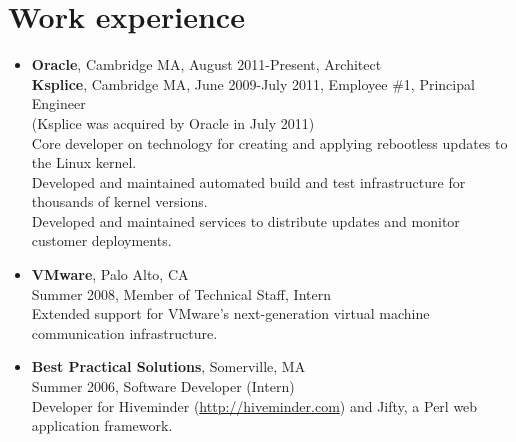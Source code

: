 \documentclass[letterpaper,10pt]{article}
\begin{document}
\section*{Work experience}
\vspace*{-0.2cm}
\begin{itemize}
\item\textbf{Oracle}, Cambridge MA, August 2011-Present, Architect \\
  \textbf{Ksplice}, Cambridge MA, June 2009-July 2011, Employee \#1, Principal Engineer \\
  {\small(Ksplice was acquired by Oracle in July 2011)} \\
  Core developer on technology for creating and applying rebootless
  updates to the Linux kernel. \\
  Developed and maintained automated build and test infrastructure for
  thousands of kernel versions. \\
  Developed and maintained services to distribute updates and
  monitor customer deployments.
  \item\textbf{VMware}, Palo Alto, CA \\
    Summer 2008, Member of Technical Staff, Intern \\
    Extended support for VMware's next-generation virtual machine
    communication infrastructure.
  \item \textbf{Best Practical Solutions}, Somerville, MA \\
    Summer 2006, Software Developer (Intern) \\
    Developer for Hiveminder (\url{http://hiveminder.com}) and Jifty,
    a Perl web application framework.

\end{itemize}
\end{document}
